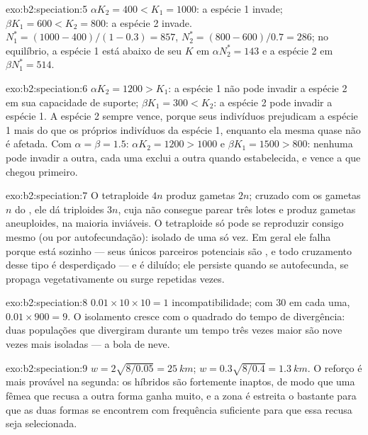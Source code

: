 \begin{solution}{exo:b2:speciation:5}
$\alpha K_2 = 400 < K_1 = 1000$: a espécie 1 invade; $\beta K_1 = 600
< K_2 = 800$: a espécie 2 invade. $N_1^{*} = (1000 - 400)/(1 - 0.3) =
857$, $N_2^{*} = (800 - 600)/0.7 = 286$; no equilíbrio, a espécie
1 está abaixo de seu $K$ em $\alpha N_2^{*} = 143$ e a espécie 2 em $\beta
N_1^{*} = 514$.
\end{solution}

\begin{solution}{exo:b2:speciation:6}
$\alpha K_2 = 1200 > K_1$: a espécie 1 não pode invadir a espécie 2 em
sua capacidade de suporte; $\beta K_1 = 300 < K_2$: a espécie 2 pode
invadir a espécie 1. A espécie 2 sempre vence, porque seus indivíduos
prejudicam a espécie 1 mais do que os próprios indivíduos da espécie 1,
enquanto ela mesma quase não é afetada. Com $\alpha = \beta = 1.5$: $\alpha K_2 = 1200 > 1000$
e $\beta K_1 = 1500 > 800$: nenhuma pode invadir a outra, cada uma
exclui a outra quando estabelecida, e vence a que chegou primeiro.
\end{solution}

\begin{solution}{exo:b2:speciation:7}
O tetraploide $4n$ produz gametas $2n$; cruzado com os gametas $n$ do
, ele dá triploides $3n$, cuja  não consegue parear três
lotes e produz gametas aneuploides, na maioria inviáveis. O
tetraploide só pode se reproduzir consigo mesmo (ou por
autofecundação): isolado de uma só vez. Em geral ele falha porque está
sozinho --- seus únicos parceiros potenciais são , e todo
cruzamento desse tipo é desperdiçado --- e é diluído; ele persiste
quando se autofecunda, se propaga vegetativamente ou surge repetidas
vezes.
\end{solution}

\begin{solution}{exo:b2:speciation:8}
$0.01\times 10\times 10 = 1$ incompatibilidade; com 30 em cada uma, $0.01\times
900 = 9$. O isolamento cresce com o quadrado do tempo de divergência:
duas populações que divergiram durante um tempo três vezes maior são
nove vezes mais isoladas --- a bola de neve.
\end{solution}

\begin{solution}{exo:b2:speciation:9}
$w = 2\sqrt{8/0.05} = \qty{25}{km}$; $w = 0.3\sqrt{8/0.4} =
\qty{1.3}{km}$. O reforço é mais provável na segunda: os híbridos são
fortemente inaptos, de modo que uma fêmea que recusa a outra forma
ganha muito, e a zona é estreita o bastante para que as duas formas se
encontrem com frequência suficiente para que essa recusa seja
selecionada.
\end{solution}


